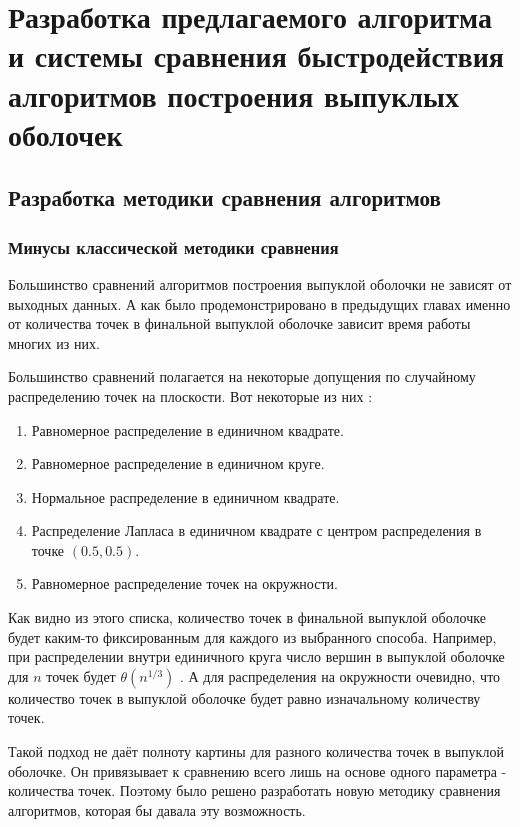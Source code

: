 \chapter{Разработка предлагаемого алгоритма и системы сравнения быстродействия алгоритмов построения выпуклых оболочек} \label{chapt3}

\section{Разработка методики сравнения алгоритмов}

\subsection{Минусы классической методики сравнения}

Большинство сравнений алгоритмов построения выпуклой оболочки не зависят от выходных данных. А как было продемонстрировано в предыдущих главах именно от количества точек в финальной выпуклой оболочке зависит время работы многих из них.

Большинство сравнений полагается на некоторые допущения по случайному распределению точек на плоскости. Вот некоторые из них \cite{chadnov2004algorithmsComparison}:

\begin{enumerate}
	\item Равномерное распределение в единичном квадрате.
	\item Равномерное распределение в единичном круге.
	\item Нормальное распределение в единичном квадрате.
	\item Распределение Лапласа в единичном квадрате с центром распределения в точке $(0.5, 0.5)$.
	\item Равномерное распределение точек на окружности.
\end{enumerate}


Как видно из этого списка, количество точек в финальной выпуклой оболочке будет каким-то фиксированным для каждого из выбранного способа. Например, при распределении внутри единичного круга число вершин в выпуклой оболочке для $n$ точек будет $\theta(n^{1/3})$ \cite{algolist2010convexhull}. А для распределения на окружности очевидно, что количество точек в выпуклой оболочке будет равно изначальному количеству точек.

Такой подход не даёт полноту картины для разного количества точек в выпуклой оболочке. Он привязывает к сравнению всего лишь на основе одного параметра - количества точек. Поэтому было решено разработать новую методику сравнения алгоритмов, которая бы давала эту возможность.

